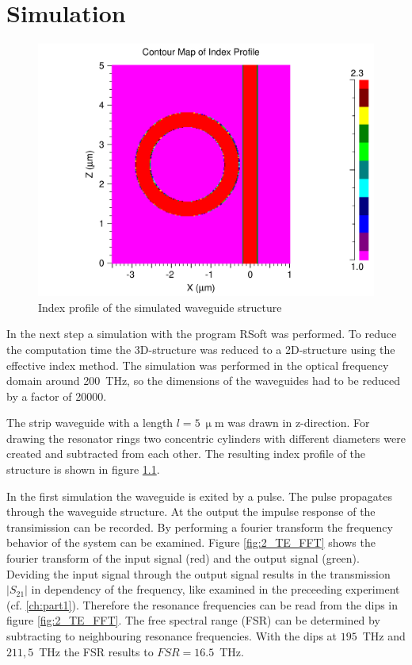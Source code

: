 \chapter{Simulation}
\begin{figure}[ht]
\centering
\includegraphics[width=.6\columnwidth]{Grafiken/11_index_profile.pdf}%
\caption{Index profile of the simulated waveguide structure}%
\label{fig:index_profile1}%
\end{figure}

In the next step a simulation with the program RSoft was performed. To reduce the computation time the 3D-structure was reduced to a 2D-structure using the effective index method. The simulation was performed in the optical frequency domain around 200~THz, so the dimensions of the waveguides had to be reduced by a factor of 20000. 

The strip waveguide with a length $l=5~\upmu$m was drawn in z-direction. For drawing the resonator rings two concentric cylinders with different diameters were created and subtracted from each other. The resulting index profile of the structure is shown in figure \ref{fig:index_profile1}.
% 



In the first simulation the waveguide is exited by a pulse. The pulse propagates through the waveguide structure. At the output the impulse response of the transimission can be recorded. By performing a fourier transform the frequency behavior of the system can be examined. Figure \ref{fig:2_TE_FFT} shows the fourier transform of the input signal (red) and the output signal (green). Deviding the input signal through the output signal results in the transmission $\left|S_{21}\right|$ in dependency of the frequency, like examined in the preceeding experiment (cf. \ref{ch:part1}). Therefore the resonance frequencies can be read from the dips in figure \ref{fig:2_TE_FFT}. The free spectral range (FSR) can be determined by subtracting to neighbouring resonance frequencies. With the dips at  $195$~THz and $211,5$~THz the FSR results to $FSR = 16.5$~THz.


